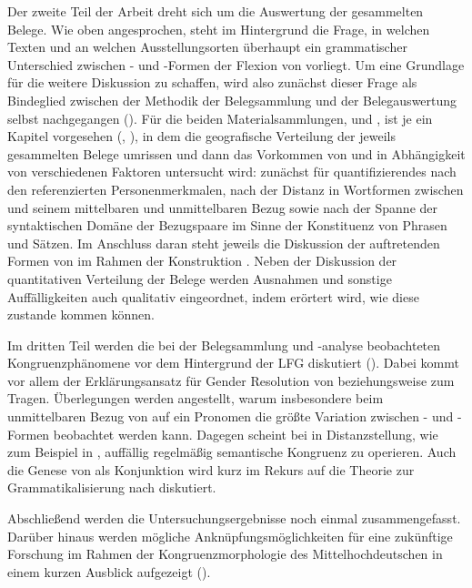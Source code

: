 Der zweite Teil der Arbeit dreht sich um die Auswertung der gesammelten Belege.
Wie oben angesprochen, steht im Hintergrund die Frage, in welchen Texten und an
welchen Ausstellungs\-orten überhaupt ein grammatischer Unterschied zwischen
- und -Formen der Flexion von  vorliegt. Um eine
Grundlage für die weitere Diskussion zu schaffen, wird also zunächst dieser
Frage als Bindeglied zwischen der Methodik der Belegsammlung und der
Belegauswertung selbst nachgegangen (). Für die beiden
Materialsammlungen, \CAO{} und \KC{}, ist je ein Kapitel vorgesehen
(, ), in dem die geografische
Verteilung der jeweils gesammelten Belege umrissen und dann das Vorkommen von
 und  in Abhängigkeit von verschiedenen Faktoren
untersucht wird: zunächst für quantifizierendes  nach den
referenzierten Personenmerkmalen, nach der Distanz in Wortformen zwischen
 und seinem mittelbaren und unmittelbaren Bezug sowie nach der
Spanne der syntaktischen Domäne der Bezugspaare im Sinne der Konstituenz von
Phrasen und Sätzen. Im Anschluss daran steht jeweils die Diskussion der
auftretenden Formen von  im Rahmen der Konstruktion
. Neben der Diskussion der quantitativen Verteilung der
Belege werden Ausnahmen und sonstige Auffälligkeiten auch qualitativ
eingeordnet, indem erörtert wird, wie diese zustande kommen können.

Im dritten Teil werden die bei der Belegsammlung und -analyse beobachteten
Kongruenzphänomene vor dem Hintergrund der LFG diskutiert
(). Dabei kommt vor allem der Erklärungsansatz für Gender
Resolution von \citet[Kapitel~8]{wechslerzlatic2003} beziehungsweise
\citet{wechsler2009} zum Tragen. Überlegungen werden angestellt, warum
insbesondere beim unmittelbaren Bezug von  auf ein Pronomen die
größte Variation zwischen - und -\allowbreak{}Formen
beobachtet werden kann. Dagegen scheint bei  in
Dis\-tanz\-stellung, wie zum Beispiel in , auffällig regelmäßig semantische Kongruenz zu operieren.
Auch die Genese von  als Konjunktion wird kurz im Rekurs auf die
Theorie zur Grammatikalisierung nach \citet{lehmann2015} diskutiert.

Abschließend werden die Untersuchungsergebnisse noch einmal zusammengefasst.
Darüber hinaus werden mögliche Anknüpfungsmöglichkeiten für eine zukünftige
Forschung im Rahmen der Kongruenzmorphologie des
Mittel\-hoch\-deutschen in einem kurzen Ausblick
aufgezeigt ().
